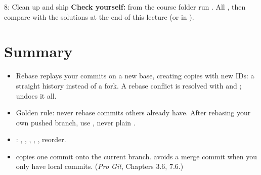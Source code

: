 \begin{homework}{8: Clean up and ship}
\textbf{Check yourself:} from the course folder run . All , then compare with the solutions at the end of this lecture (or in ).
\end{homework}

\section{Summary}

\begin{itemize}
  \item Rebase replays your commits on a new base, creating copies with new IDs: a straight history instead of a fork. A rebase conflict is resolved with  and ;  undoes it all.
  \item Golden rule: never rebase commits others already have. After rebasing your own pushed branch, use , never plain .
  \item {}: , , , , , reorder.
  \item {} copies one commit onto the current branch.  avoids a merge commit when you only have local commits. (\emph{Pro Git}, Chapters 3.6, 7.6.)
\end{itemize}


\solutionspage




